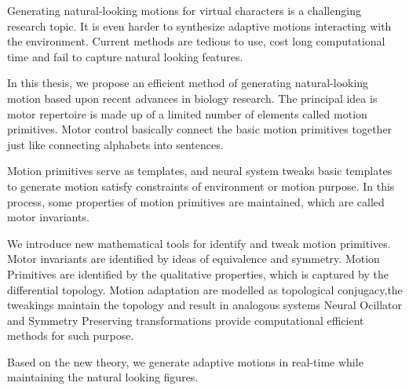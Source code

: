 


\begin{abstracts}        %

Generating natural-looking motions for virtual characters is a challenging research topic.
It is even harder to synthesize adaptive motions interacting with the environment. 
Current methods are tedious to use, cost long computational time and fail to capture natural looking features.

In this thesis, we propose an efficient method of generating natural-looking motion based upon recent advances in biology research.
The principal idea is motor repertoire is made up of a limited number of elements called motion primitives. 
Motor control basically connect the basic motion primitives together just like connecting alphabets into sentences.


Motion primitives serve as templates, and neural system tweaks basic templates to generate motion satisfy constraints of environment or motion purpose.
In this process, some properties of motion primitives are maintained, which are called motor invariants.


We introduce new mathematical tools for identify and tweak motion primitives.
Motor invariants are identified by ideas of equivalence and symmetry.
Motion Primitives are identified by the qualitative properties, which is captured by the differential topology.
Motion adaptation are modelled as topological conjugacy,the tweakings maintain the topology and result in analogous systems
Neural Ocillator and Symmetry Preserving transformations provide computational efficient methods for such purpose.

Based on the new theory, we generate adaptive motions in real-time while maintaining the natural looking figures.

\end{abstracts}





